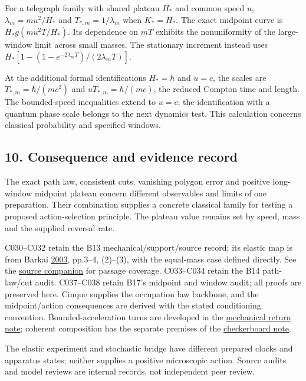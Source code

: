 \documentclass[11pt,a4paper]{article}
\begin{document}
For a telegraph family with shared plateau \(H_*\) and common speed
\(u\), \(\lambda_m=mu^2/H_*\) and \(T_{*,m}=1/\lambda_m\) when
\(K_*=H_*\). The exact midpoint curve is \(H_*g(mu^2T/H_*)\). Its
dependence on \(mT\) exhibits the nonuniformity of the large-window
limit across small masses. The stationary increment instead uses
\(H_*[1-(1-e^{-2\lambda_mT})/(2\lambda_mT)]\).

At the additional formal identifications \(H_*=\hbar\) and \(u=c\), the
scales are \(T_{*,m}=\hbar/(mc^2)\) and \(uT_{*,m}=\hbar/(mc)\), the
reduced Compton time and length. The bounded-speed inequalities extend
to \(u=c\); the identification with a quantum phase scale belongs to the
next dynamics test. This calculation concerns classical probability and
specified windows.

\hypertarget{consequence-and-evidence-record}{%
\subsection{10. Consequence and evidence
record}\label{consequence-and-evidence-record}}

The exact path law, consistent cuts, vanishing polygon error and
positive long-window midpoint plateau concern different observables and
limits of one preparation. Their combination supplies a concrete
classical family for testing a proposed action-selection principle. The
plateau value remains set by speed, mass and the supplied reversal rate.

C030--C032 retain the B13 mechanical/support/source record; its elastic
map is from Barkai
\href{https://arxiv.org/abs/cond-mat/0303255v1}{2003}, pp.3--4,
(2)--(3), with the equal-mass case defined directly. See the
\href{../docs/batches/B13/B13-source-companion.md}{source companion} for
passage coverage. C033--C034 retain the B14 path-law/cut audit.
C037--C038 retain B17's midpoint and window audit; all proofs are
preserved here. Cinque supplies the occupation law backbone, and the
midpoint/action consequences are derived with the stated conditioning
convention. Bounded-acceleration turns are developed in the
\href{bounded-acceleration-return.md}{mechanical return note}; coherent
composition has the separate premises of the
\href{checkerboard-dynamics.md}{checkerboard note}.

The elastic experiment and stochastic bridge have different prepared
clocks and apparatus states; neither supplies a positive microscopic
action. Source audits and model reviews are internal records, not
independent peer review.
\end{document}
